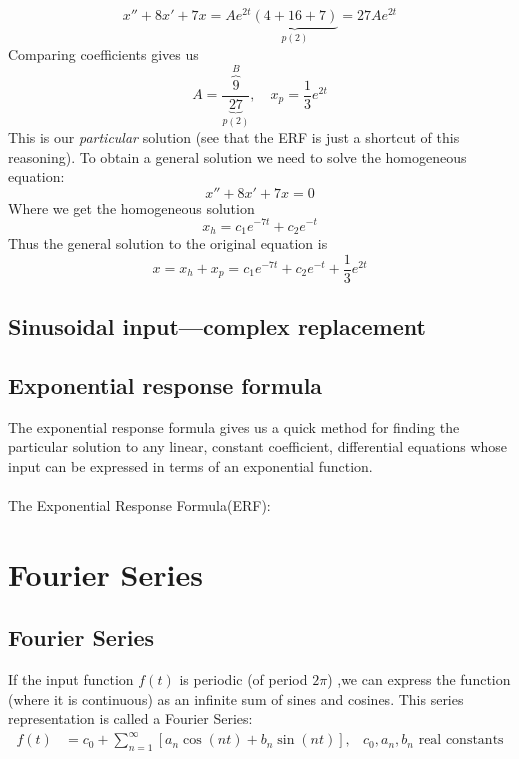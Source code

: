 \documentclass{report}
\begin{document}
\begin{equation*}
x''+8x'+7x=Ae^{2t}\underbrace{(4+16+7)}_{p(2)}=27Ae^{2t}
\end{equation*}
Comparing coefficients gives us
\begin{equation*}
A=\frac{\overbrace{9}^{B}}{\underbrace{27}_{p(2)}},\quad x_p=\frac{1}{3}e^{2t}
\end{equation*}
This is our \textit{particular} solution (see that the ERF is just a shortcut of this reasoning). To obtain 
a general solution we need to solve the homogeneous equation:
\begin{equation*}
x''+8x'+7x=0
\end{equation*}
Where we get the homogeneous solution
\begin{equation*}
x_h=c_1e^{-7t}+c_2e^{-t}
\end{equation*}
Thus the general solution to the original equation is
\begin{equation*}
x=x_h+x_p=c_1e^{-7t}+c_2e^{-t}+\frac{1}{3}e^{2t}
\end{equation*}
\newpage

\subsection{Sinusoidal input---complex replacement}




\newpage

\subsection{Exponential response formula}
The exponential response formula gives us a quick method for finding the particular solution to 
any linear, constant coefficient, differential equations whose input can be expressed in terms
of an exponential function.\\
\vspace{2mm}\\
The Exponential Response Formula(ERF): 

\section{Fourier Series}
\subsection{Fourier Series}
If the input function $f(t)$ is periodic (of period $2\pi$)
,we can express the function (where it is continuous) as an
infinite sum of sines and cosines.
This series representation is called a Fourier Series:
\begin{align*}
f(t)&=c_0+\sum_{n=1}^{\infty}[a_n\cos(nt)+b_n\sin(nt)], 
& \text{$c_0, a_n, b_n$ real constants}
\end{align*}
\end{document}
